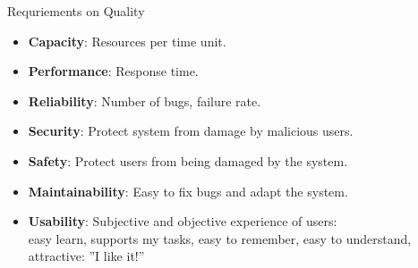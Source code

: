 \documentclass{simpleslides}
\begin{document}
\begin{frame}[fragile]{Requriements on Quality}
\begin{itemize}
\begin{itemize}
\item \textbf{Capacity}: Resources per time unit.
\item \textbf{Performance}: Response time.
\item \textbf{Reliability}: Number of bugs, failure rate.
\item \textbf{Security}: Protect system from damage by malicious users. 
\item \textbf{Safety}: Protect users from being damaged by the system.
\item \textbf{Maintainability}: Easy to fix bugs and adapt the system.
\item \textbf{Usability}: Subjective and objective experience of users:\\ easy learn, supports my tasks, easy to remember, easy to understand, attractive: ''I like it!'' 
\end{itemize}
\end{itemize}
\end{frame}
\end{document}

